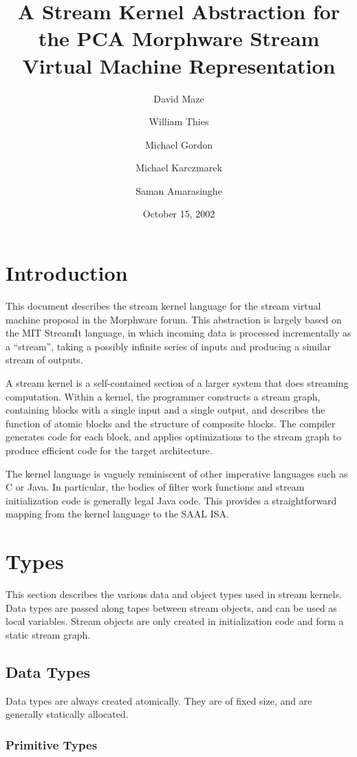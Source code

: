 \documentclass[11pt]{article}
\title{A Stream Kernel Abstraction for the PCA Morphware Stream
  Virtual Machine Representation}
\author{David Maze \and William Thies \and Michael Gordon \and Michael
  Karczmarek \and Saman Amarasinghe}
\date{October 15, 2002}
\begin{document}
\maketitle
\tableofcontents

\section{Introduction}

This document describes the stream kernel language for the stream
virtual machine proposal in the Morphware forum.  This abstraction is
largely based on the MIT StreamIt language, in which incoming data is
processed incrementally as a ``stream'', taking a possibly infinite
series of inputs and producing a similar stream of outputs.

A stream kernel is a self-contained section of a larger system that
does streaming computation.  Within a kernel, the programmer
constructs a stream graph, containing blocks with a single input and a
single output, and describes the function of atomic blocks and the
structure of composite blocks.  The compiler generates code for each
block, and applies optimizations to the stream graph to produce
efficient code for the target architecture.

The kernel language is vaguely reminiscent of other imperative
languages such as C or Java.  In particular, the bodies of filter work
functions and stream initialization code is generally legal Java
code.  This provides a straightforward mapping from the kernel
language to the SAAL ISA.

\section{Types}

This section describes the various data and object types used in
stream kernels.  Data types are passed along tapes between stream
objects, and can be used as local variables.  Stream objects are only
created in initialization code and form a static stream graph.

\subsection{Data Types}

Data types are always created atomically.  They are of fixed size, and
are generally statically allocated.

\subsubsection{Primitive Types}
\end{document}
